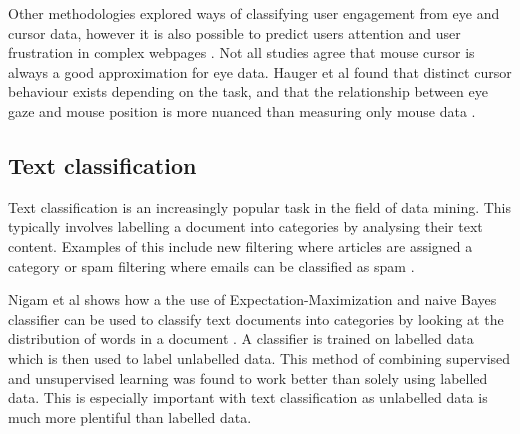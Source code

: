 \documentclass{article}
\begin{document}
Other methodologies explored ways of classifying user engagement from eye and cursor data, however it is also possible to predict users attention and user frustration in complex webpages \cite{navalpakkam2012mouse}.
Not all studies agree that mouse cursor is always a good approximation for eye data. 
Hauger et al found that distinct cursor behaviour exists depending on the task, and that the relationship between eye gaze and mouse position is more nuanced than measuring only mouse data \cite{huang2012user}.






\subsection{Text classification}

Text classification is an increasingly popular task in the field of data mining.
This typically involves labelling a document into categories by analysing their text content.
Examples of this include new filtering where articles are assigned a category or spam filtering where emails can be classified as spam \cite{aggarwal2012survey}.

Nigam et al shows how a the use of Expectation-Maximization and naive Bayes classifier can be used to classify text documents into categories by looking at the distribution of words in a document \cite{nigam2000text}.
A classifier is trained on labelled data which is then used to label unlabelled data.
This method of combining supervised and unsupervised learning was found to work better than solely using labelled data.
This is especially important with text classification as unlabelled data is much more plentiful than labelled data.
\end{document}
